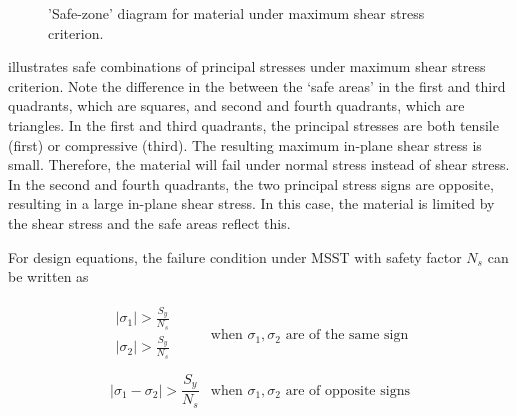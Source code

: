 \documentclass[
10pt,
a4paper,
openany,
svgnames,
]{book}
\begin{document}
\begin{figure}[h]
  \centering
  \caption{'Safe-zone' diagram for material under maximum shear stress criterion.}
  \label{fig: MSST safe zone}
\end{figure}

 illustrates safe combinations of principal stresses under maximum shear stress criterion. Note the difference in the between the ‘safe areas’ in the first and third quadrants, which are squares, and second and fourth quadrants, which are triangles. In the first and third quadrants, the principal stresses are both tensile (first) or compressive (third). The resulting maximum in-plane shear stress is small. Therefore, the material will fail under normal stress instead of shear stress. In the second and fourth quadrants, the two principal stress signs are opposite, resulting in a large in-plane shear stress. In this case, the material is limited by the shear stress and the safe areas reflect this.

For design equations, the failure condition under MSST with safety factor $N_s$ can be written as

\begin{equation}
  \label{eqn: MSST design eqn}
  \begin{array}{ll}
    \begin{gathered}
      \left| \sigma_1 \right| > \frac{S_y}{N_s} \\
      \left| \sigma_2 \right| > \frac{S_y}{N_s}  \\ 
    \end{gathered} & \text{when } \sigma_1, \sigma_2 \text{ are of the same sign} \\[20pt]
    \left| {\sigma _1} - {\sigma _2} \right| > \dfrac{S_y}{N_s} & \text{when } \sigma_1, \sigma_2 \text{ are of opposite signs}
  \end{array}
\end{equation}
\end{document}
